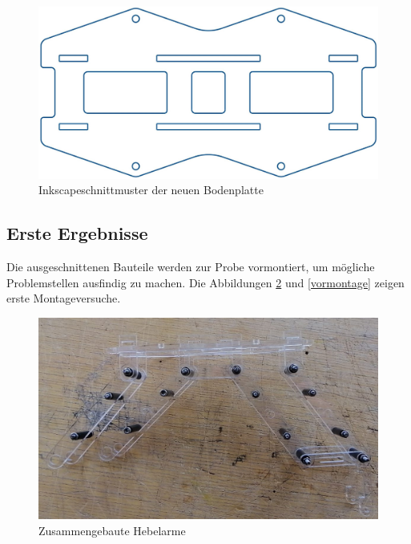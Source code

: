 \begin{figure}[h]
\begin{center}
\includegraphics[scale=0.5]{Grafiken/Inkscapebodenplatte.jpg}
\caption{Inkscapeschnittmuster der neuen Bodenplatte}
\label{inkscape1}
\end{center}
\end{figure}

\subsection{Erste Ergebnisse}
Die ausgeschnittenen Bauteile werden zur Probe vormontiert, um mögliche Problemstellen ausfindig zu machen. Die Abbildungen \ref{hebelarme} und \ref{vormontage} zeigen erste Montageversuche.

\begin{figure}[h]
\begin{center}
\includegraphics[angle=90,scale=0.3]{Grafiken/Fotohebelarme.jpg}
\caption{Zusammengebaute Hebelarme}
\label{hebelarme}
\end{center}
\end{figure}

